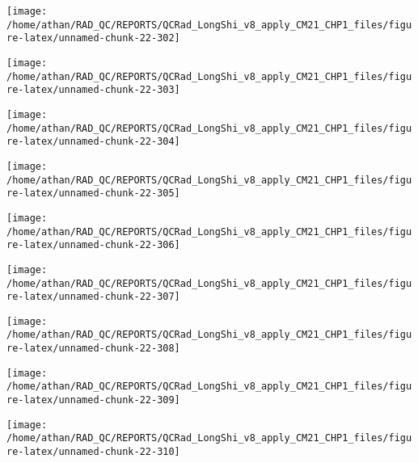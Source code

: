\documentclass[
  10pt,
  a4paper,oneside]{article}
\begin{document}
\begin{center}\texttt{[image: /home/athan/RAD\_QC/REPORTS/QCRad\_LongShi\_v8\_apply\_CM21\_CHP1\_files/figure-latex/unnamed-chunk-22-302]} \end{center}

\begin{center}\texttt{[image: /home/athan/RAD\_QC/REPORTS/QCRad\_LongShi\_v8\_apply\_CM21\_CHP1\_files/figure-latex/unnamed-chunk-22-303]} \end{center}

\begin{center}\texttt{[image: /home/athan/RAD\_QC/REPORTS/QCRad\_LongShi\_v8\_apply\_CM21\_CHP1\_files/figure-latex/unnamed-chunk-22-304]} \end{center}

\begin{center}\texttt{[image: /home/athan/RAD\_QC/REPORTS/QCRad\_LongShi\_v8\_apply\_CM21\_CHP1\_files/figure-latex/unnamed-chunk-22-305]} \end{center}

\begin{center}\texttt{[image: /home/athan/RAD\_QC/REPORTS/QCRad\_LongShi\_v8\_apply\_CM21\_CHP1\_files/figure-latex/unnamed-chunk-22-306]} \end{center}

\begin{center}\texttt{[image: /home/athan/RAD\_QC/REPORTS/QCRad\_LongShi\_v8\_apply\_CM21\_CHP1\_files/figure-latex/unnamed-chunk-22-307]} \end{center}

\begin{center}\texttt{[image: /home/athan/RAD\_QC/REPORTS/QCRad\_LongShi\_v8\_apply\_CM21\_CHP1\_files/figure-latex/unnamed-chunk-22-308]} \end{center}

\begin{center}\texttt{[image: /home/athan/RAD\_QC/REPORTS/QCRad\_LongShi\_v8\_apply\_CM21\_CHP1\_files/figure-latex/unnamed-chunk-22-309]} \end{center}

\begin{center}\texttt{[image: /home/athan/RAD\_QC/REPORTS/QCRad\_LongShi\_v8\_apply\_CM21\_CHP1\_files/figure-latex/unnamed-chunk-22-310]} \end{center}
\end{document}
